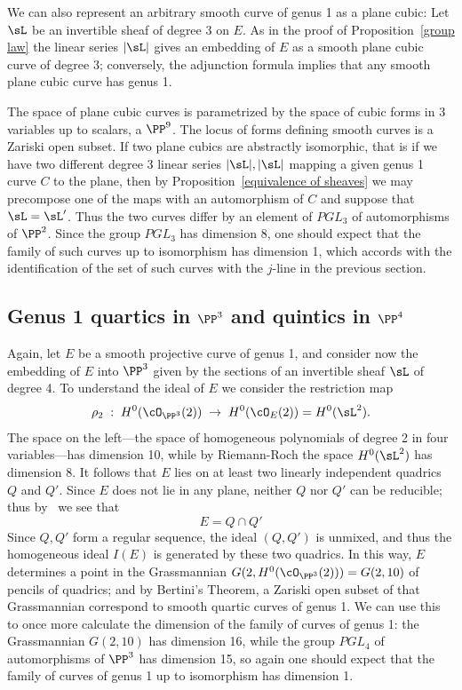 We can also represent an arbitrary smooth curve of genus 1 as a plane cubic:
Let $\sL$ be an invertible sheaf of degree 3 on $E$. As in the proof of Proposition~\ref{group law} the linear series $|\sL|$ gives an embedding of $E$ as a smooth plane cubic curve of degree 3; conversely, the adjunction formula implies that any smooth plane cubic curve has genus 1. 

The space of plane cubic curves is parametrized by the space of cubic forms in 3 variables up to 
scalars, a  $\PP^9$. The locus of forms defining smooth curves is a Zariski open subset. If two plane cubics are abstractly
isomorphic, that is if we have two different degree 3 linear series $|\sL|, |\sL|$ mapping a given genus 1 curve $C$ to the plane, then by
Proposition~\ref{equivalence of sheaves} we may  precompose one of the maps with an automorphism of $C$
and suppose that $\sL = \sL'$. Thus the two curves differ by an element of $PGL_3$ of automorphisms of $\PP^2$. Since the group $PGL_3$ has dimension 8, one should expect that the family of such curves up to isomorphism has dimension 1, which accords with the identification of the set of such
curves with the $j$-line in the previous section.



\subsection{Genus 1 quartics in $\PP^3$ and quintics in $\PP^4$} \label{g=1 in P3,P4}

Again, let $E$ be a smooth projective curve of genus 1, and consider now the embedding of $E$ into $\PP^3$ given by the sections of an invertible sheaf $\sL$ of degree 4. To understand the ideal of $E$ we consider the restriction map
$$
\rho_2 \;  : \; H^0(\cO_{\PP^3}(2)) \; \to \; H^0(\cO_{E}(2)) = H^0(\sL^2).
$$
The space on the left---the space of homogeneous polynomials of degree 2 in four variables---has dimension 10, while by Riemann-Roch the space $H^0(\sL^2)$ has dimension 8. It follows that $E$ lies on at least two linearly independent quadrics $Q$ and $Q'$. Since $E$ does not lie in any plane, neither $Q$ nor $Q'$ can be reducible; thus by \bt\ we see that
$$
E = Q \cap Q'
$$
Since $Q,Q'$ form a regular sequence, the ideal $(Q,Q')$ is unmixed, and thus the homogeneous ideal $I(E)$ is generated by
these two quadrics. In this way, $E$ determines a point in the Grassmannian $G(2, H^0(\cO_{\PP^3}(2))) = G(2, 10)$ of pencils of quadrics; and by Bertini's Theorem, a Zariski open subset of that Grassmannian correspond to smooth quartic curves of genus 1. We can use this to once more calculate the dimension of the family of curves of genus 1: the Grassmannian $G(2,10)$ has dimension 16, while the group $PGL_4$ of automorphisms of $\PP^3$ has dimension 15, so again one should expect that the family of curves of genus 1 up to isomorphism has dimension 1.

